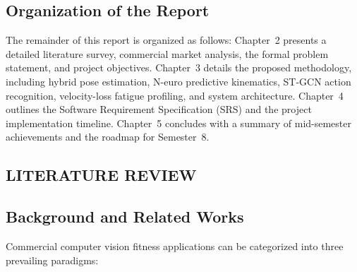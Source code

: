 \documentclass[12pt,a4paper]{report}
\begin{document}
\section{Organization of the Report}
The remainder of this report is organized as follows:
Chapter~2 presents a detailed literature survey, commercial market analysis, the formal problem statement, and project objectives.
Chapter~3 details the proposed methodology, including hybrid pose estimation, N-euro predictive kinematics, ST-GCN action recognition, velocity-loss fatigue profiling, and system architecture.
Chapter~4 outlines the Software Requirement Specification (SRS) and the project implementation timeline.
Chapter~5 concludes with a summary of mid-semester achievements and the roadmap for Semester~8.

\begin{center}
    \chapter{LITERATURE REVIEW}
\end{center}

\section{Background and Related Works}
Commercial computer vision fitness applications can be categorized into three prevailing paradigms:
\end{document}
